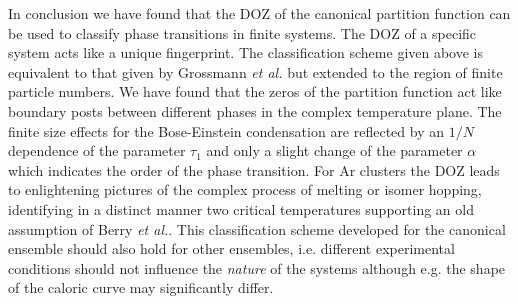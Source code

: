 In conclusion we have found that the DOZ of the canonical partition
function can be used to classify phase transitions in finite systems.
The DOZ of a specific system acts like a unique fingerprint.  The
classification scheme given above is equivalent to that given by
Grossmann {\sl et al.} but extended to the region of finite particle
numbers. We have found that the zeros of the partition function act like
boundary posts between different phases in the complex temperature
plane. The finite size effects for the Bose-Einstein condensation are
reflected by an $1/N$ dependence of the parameter $\tau_1$ and only a
slight change of the parameter $\alpha$ which indicates the order of the
phase transition.  For Ar clusters the DOZ leads to enlightening
pictures of the complex process of melting or isomer hopping,
identifying in a distinct manner two critical temperatures supporting an
old assumption of Berry {\sl et al.}\cite{Berry:1984,Berry:1984a}.  This
classification scheme developed for the canonical ensemble
  should also
hold for other ensembles, i.e. different experimental conditions should
not influence the {\sl nature} of the systems although e.g. the shape of
the caloric curve may significantly differ. 

